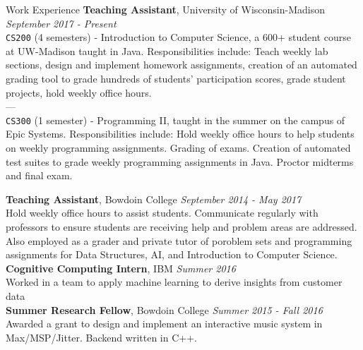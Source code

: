 \documentclass{resume} %
\begin{document}
\begin{rSection}{Work Experience}
{\bf Teaching Assistant}, University of Wisconsin-Madison \hfill {\em September 2017 - Present} 
\\\texttt{CS200} (4 semesters) - Introduction to Computer Science, a 600+ student course at UW-Madison taught in Java. Responsibilities include: Teach weekly lab sections, design and implement homework assignments, creation of an automated grading tool to grade hundreds of students' participation scores, grade student projects, hold weekly office hours. \\
---\\
\texttt{CS300} (1 semester) - Programming II, taught in the summer on the campus of Epic Systems. Responsibilities include: Hold weekly office hours to help students on weekly programming assignments. Grading of exams. Creation of automated test suites to grade weekly programming assignments in Java. Proctor midterms and final exam. 

{\bf Teaching Assistant}, Bowdoin College \hfill {\em September 2014 - May 2017}\\
Hold weekly office hours to assist students. Communicate regularly with professors to ensure students are receiving help and problem areas are addressed. Also employed as a grader and private tutor of poroblem sets and programming assignments for Data Structures, AI, and Introduction to Computer Science. \\

{\bf Cognitive Computing Intern}, IBM \hfill {\em Summer 2016} \\
Worked in a team to apply machine learning to derive insights from customer data\\

{\bf Summer Research Fellow}, Bowdoin College \hfill {\em Summer 2015 - Fall 2016}\\
Awarded a grant to design and implement an interactive music system in Max/MSP/Jitter. Backend written in C++.

\end{rSection}
\end{document}
